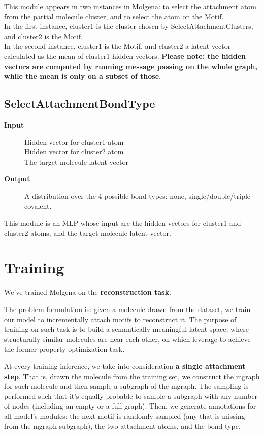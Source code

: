 \documentclass{article}
\begin{document}
This module appears in two instances in Molgena: to select the attachment atom from the partial molecule cluster, and to select the atom on the Motif.\\
In the first instance, cluster1 is the cluster chosen by SelectAttachmentClusters, and cluster2 is the Motif.\\
In the second instance, cluster1 is the Motif, and cluster2 a latent vector calculated as the mean of cluster1 hidden vectors.
\textbf{Please note: the hidden vectors are computed by running message passing on the whole graph, while the mean is only on a subset of those}.


\subsection{SelectAttachmentBondType}

\begin{description}
\item[\textbf{Input}]
    Hidden vector for cluster1 atom\\
    Hidden vector for cluster2 atom\\
    The target molecule latent vector
\item[\textbf{Output}]
    A distribution over the 4 possible bond types: none, single/double/triple covalent.
\end{description}

This module is an MLP whose input are the hidden vectors for cluster1 and cluster2 atoms, and the target molecule latent vector.


\section{Training}

We've trained Molgena on the \textbf{reconstruction task}.

The problem formulation is: given a molecule drawn from the dataset, we train our model to incrementally attach motifs to reconstruct it.
The purpose of training on such task is to build a semantically meaningful latent space, where structurally similar molecules are near each other,
on which leverage to achieve the former property optimization task.

At every training inference, we take into consideration \textbf{a single attachment step}.
That is, drawn the molecule from the training set, we construct the mgraph for such molecule and then sample a subgraph of the mgraph.
The sampling is performed such that it's equally probable to sample a subgraph with any number of nodes (including an empty or a full graph).
Then, we generate annotations for all model's modules:
the next motif is randomly sampled (any that is missing from the mgraph subgraph),
the two attachment atoms, and the bond type.
\end{document}
